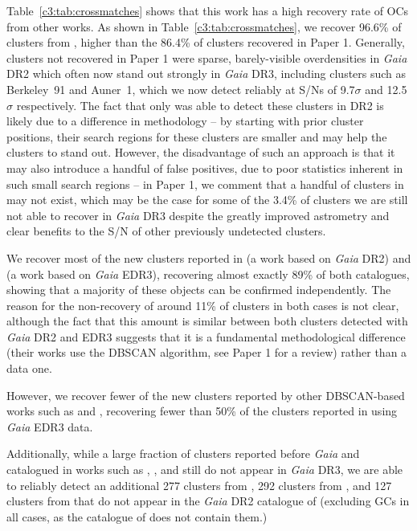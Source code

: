 Table~\ref{c3:tab:crossmatches} shows that this work has a high recovery rate of OCs from other works. As shown in Table~\ref{c3:tab:crossmatches}, we recover 96.6\% of clusters from \cite{cantat-gaudin_clusters_2020}, higher than the 86.4\% of clusters recovered in Paper 1. Generally, clusters not recovered in Paper 1 were sparse, barely-visible overdensities in \emph{Gaia} DR2 which often now stand out strongly in \emph{Gaia} DR3, including clusters such as Berkeley~91 and Auner~1, which we now detect reliably at S/Ns of 9.7$\sigma$ and 12.5$\sigma$ respectively. The fact that only \cite{cantat-gaudin_clusters_2020} was able to detect these clusters in DR2 is likely due to a difference in methodology -- by starting with prior cluster positions, their search regions for these clusters are smaller and may help the clusters to stand out. However, the disadvantage of such an approach is that it may also introduce a handful of false positives, due to poor statistics inherent in such small search regions -- in Paper 1, we comment that a handful of clusters in \cite{cantat-gaudin_painting_2020} may not exist, which may be the case for some of the 3.4\% of clusters we are still not able to recover in \emph{Gaia} DR3 despite the greatly improved astrometry and clear benefits to the S/N of other previously undetected clusters. 

We recover most of the new clusters reported in \cite{castro-ginard_hunting_2020} (a work based on \emph{Gaia} DR2) and \cite{castro-ginard_hunting_2022} (a work based on \emph{Gaia} EDR3), recovering almost exactly 89\% of both catalogues, showing that a majority of these objects can be confirmed independently. The reason for the non-recovery of around 11\% of clusters in both cases is not clear, although the fact that this amount is similar between both clusters detected with \emph{Gaia} DR2 and EDR3 suggests that it is a fundamental methodological difference (their works use the DBSCAN algorithm, see Paper 1 for a review) rather than a data one. 

However, we recover fewer of the new clusters reported by other DBSCAN-based works such as \cite{hao_sixteen_2020, hao_newly_2022} and \cite{he_catalogue_2021, he_blind_allsky_2022, he_new_2022, he_unveiling_hidden_2022}, recovering fewer than 50\% of the clusters reported in \cite{he_blind_allsky_2022, he_unveiling_hidden_2022} using \emph{Gaia} EDR3 data.

Additionally, while a large fraction of clusters reported before \emph{Gaia} and catalogued in works such as \cite{dias_new_2002}, \cite{kharchenko_global_2013}, and \cite{bica_multi-band_2018} still do not appear in \emph{Gaia} DR3, we are able to reliably detect an additional 277 clusters from \cite{dias_new_2002}, 292 clusters from \cite{kharchenko_global_2013}, and 127 clusters from \cite{bica_multi-band_2018} that do not appear in the \emph{Gaia} DR2 catalogue of \cite{cantat-gaudin_clusters_2020} (excluding GCs in all cases, as the catalogue of \cite{cantat-gaudin_clusters_2020} does not contain them.)

